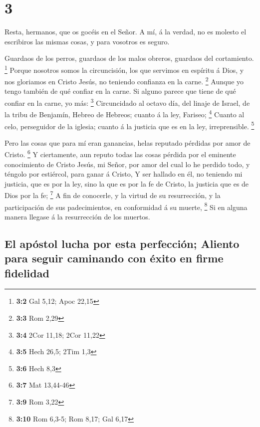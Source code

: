 \hypertarget{section-2}{%
\section{3}\label{section-2}}

 Resta, hermanos, que os gocéis en el Señor. A mí, á la
verdad, no es molesto el escribiros las mismas cosas, y para vosotros es
seguro.

 Guardaos de los perros, guardaos de los malos obreros,
guardaos del cortamiento. \footnote{\textbf{3:2} Gal 5,12; Apoc 22,15}
 Porque nosotros somos la circuncisión, los que servimos
en espíritu á Dios, y nos gloriamos en Cristo Jesús, no teniendo
confianza en la carne. \footnote{\textbf{3:3} Rom 2,29} 
Aunque yo tengo también de qué confiar en la carne. Si alguno parece que
tiene de qué confiar en la carne, yo más: \footnote{\textbf{3:4} 2Cor
  11,18; 2Cor 11,22}  Circuncidado al octavo día, del
linaje de Israel, de la tribu de Benjamín, Hebreo de Hebreos; cuanto á
la ley, Fariseo; \footnote{\textbf{3:5} Hech 26,5; 2Tim 1,3}
 Cuanto al celo, perseguidor de la iglesia; cuanto á la
justicia que es en la ley, irreprensible. \footnote{\textbf{3:6} Hech
  8,3}

 Pero las cosas que para mí eran ganancias, helas reputado
pérdidas por amor de Cristo. \footnote{\textbf{3:7} Mat 13,44-46}
 Y ciertamente, aun reputo todas las cosas pérdida por el
eminente conocimiento de Cristo Jesús, mi Señor, por amor del cual lo he
perdido todo, y téngolo por estiércol, para ganar á Cristo,
 Y ser hallado en él, no teniendo mi justicia, que es por
la ley, sino la que es por la fe de Cristo, la justicia que es de Dios
por la fe; \footnote{\textbf{3:9} Rom 3,22}  A fin de
conocerle, y la virtud de su resurrección, y la participación de sus
padecimientos, en conformidad á su muerte, \footnote{\textbf{3:10} Rom
  6,3-5; Rom 8,17; Gal 6,17}  Si en alguna manera llegase
á la resurrección de los muertos.

\hypertarget{el-apuxf3stol-lucha-por-esta-perfecciuxf3n-aliento-para-seguir-caminando-con-uxe9xito-en-firme-fidelidad}{%
\subsection{El apóstol lucha por esta perfección; Aliento para seguir
caminando con éxito en firme
fidelidad}\label{el-apuxf3stol-lucha-por-esta-perfecciuxf3n-aliento-para-seguir-caminando-con-uxe9xito-en-firme-fidelidad}}

